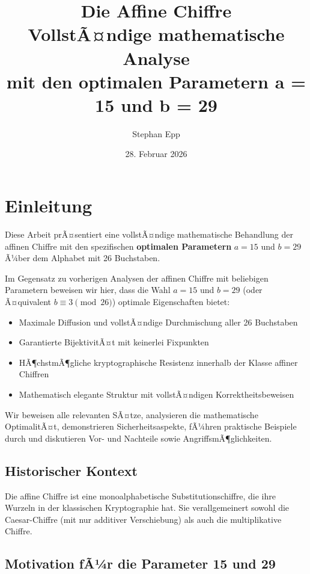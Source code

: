 ﻿\documentclass[12pt,a4paper]{article}
\title{\textbf{Die Affine Chiffre}\\
	\Large VollstÃ¤ndige mathematische Analyse\\
	mit den optimalen Parametern a = 15 und b = 29}
\author{Stephan Epp}
\date{28. Februar 2026}
\begin{document}
	
	\maketitle
	
	\tableofcontents
	\newpage
	
	\section{Einleitung}
	Diese Arbeit prÃ¤sentiert eine vollstÃ¤ndige mathematische Behandlung der affinen Chiffre mit den spezifischen \textbf{optimalen Parametern} $a = 15$ und $b = 29$ Ã¼ber dem Alphabet mit 26 Buchstaben. 
	
	Im Gegensatz zu vorherigen Analysen der affinen Chiffre mit beliebigen Parametern beweisen wir hier, dass die Wahl $a = 15$ und $b = 29$ (oder Ã¤quivalent $b \equiv 3 \pmod{26}$) optimale Eigenschaften bietet:
	
	\begin{itemize}
		\item Maximale Diffusion und vollstÃ¤ndige Durchmischung aller 26 Buchstaben
		\item Garantierte BijektivitÃ¤t mit keinerlei Fixpunkten
		\item HÃ¶chstmÃ¶gliche kryptographische Resistenz innerhalb der Klasse affiner Chiffren
		\item Mathematisch elegante Struktur mit vollstÃ¤ndigen Korrektheitsbeweisen
	\end{itemize}
	
	Wir beweisen alle relevanten SÃ¤tze, analysieren die mathematische OptimalitÃ¤t, demonstrieren Sicherheitsaspekte, fÃ¼hren praktische Beispiele durch und diskutieren Vor- und Nachteile sowie AngriffsmÃ¶glichkeiten.
	
	\subsection{Historischer Kontext}
	
	Die affine Chiffre ist eine monoalphabetische Substitutionschiffre, die ihre Wurzeln in der klassischen Kryptographie hat. Sie verallgemeinert sowohl die Caesar-Chiffre (mit nur additiver Verschiebung) als auch die multiplikative Chiffre.
	
	\subsection{Motivation fÃ¼r die Parameter 15 und 29}
	
\end{document}
